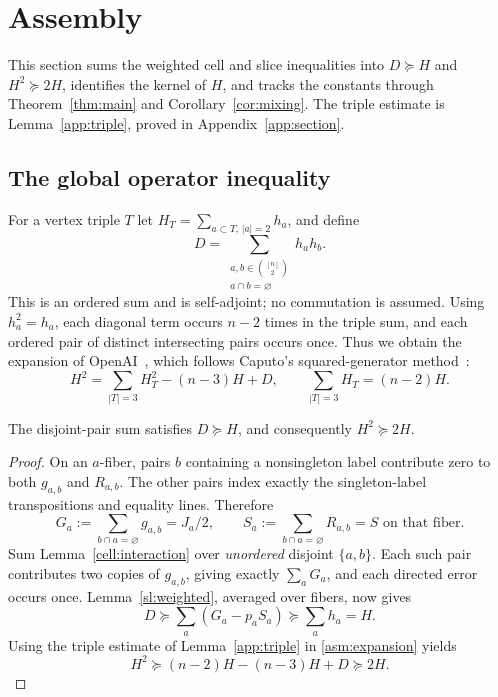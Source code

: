 \section{Assembly}\label{asm:section}
This section sums the weighted cell and slice inequalities into $D\succeq H$
and $H^2\succeq2H$, identifies the kernel of $H$, and tracks the constants
through Theorem~\ref{thm:main} and Corollary~\ref{cor:mixing}. The triple
estimate is Lemma~\ref{app:triple}, proved in Appendix~\ref{app:section}.

\subsection{The global operator inequality}
For a vertex triple $T$ let $H_T=\sum_{a\subset T,\,|a|=2}h_a$, and define
\[
 D=\sum_{\substack{a,b\in\binom{[n]}2\\a\cap b=\varnothing}}h_ah_b.
\]
This is an ordered sum and is self-adjoint; no commutation is assumed.
Using $h_a^2=h_a$, each diagonal term occurs $n-2$ times in the triple sum,
and each ordered pair of distinct intersecting pairs occurs once. Thus we
obtain the expansion of OpenAI~\cite[Proposition~7.1]{OAI26}, which follows
Caputo's squared-generator method~\cite[Section~1.1,
Equations~(1.13)--(1.15)]{Caputo08}:
\begin{equation}\label{asm:expansion}
 H^2=\sum_{|T|=3}H_T^2-(n-3)H+D,\qquad
 \sum_{|T|=3}H_T=(n-2)H.
\end{equation}

\begin{proposition}\label{asm:global}
The disjoint-pair sum satisfies $D\succeq H$, and consequently
$H^2\succeq2H$.
\end{proposition}
\begin{proof}
On an $a$-fiber, pairs $b$ containing a nonsingleton label contribute zero to
both $g_{a,b}$ and $R_{a,b}$. The other pairs index exactly the
singleton-label transpositions and equality lines. Therefore
\[
 G_a:=\sum_{b\cap a=\varnothing}g_{a,b}=J_a/2,\qquad
 S_a:=\sum_{b\cap a=\varnothing}R_{a,b}=S\text{ on that fiber}.
\]
Sum Lemma~\ref{cell:interaction} over \emph{unordered} disjoint $\{a,b\}$.
Each such pair contributes two copies of $g_{a,b}$, giving exactly
$\sum_a G_a$, and each directed error occurs once. Lemma~\ref{sl:weighted},
averaged over fibers, now gives
\[
 D\succeq\sum_a(G_a-p_aS_a)\succeq\sum_a h_a=H.
\]
Using the triple estimate of Lemma~\ref{app:triple} in
\eqref{asm:expansion} yields
\[
 H^2\succeq(n-2)H-(n-3)H+D\succeq2H.
\]
\end{proof}

